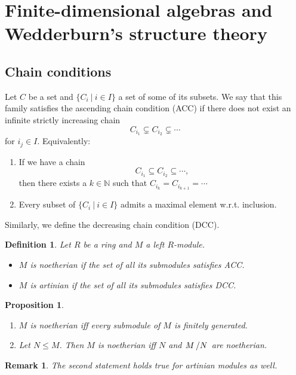 \documentclass[10pt, a4paper]{article}
\newtheorem{proposition}[thm]{Proposition}
\newtheorem{defi}[thm]{Definition}
\newenvironment{noticeB}{%
  \tcolorbox[%
  notitle,
  empty,
  enhanced,  %
  breakable,
  coltext=black,
  colback=white, 
  fontupper=\rmfamily,
  noparskip,
  sharp corners,
  boxrule=-1pt,  %
  frame hidden,
  left=7pt,  %
  right=7pt,
  top=5pt,
  bottom=5pt,
  before skip=2.5ex plus 2pt,
  after skip=2.5ex plus 2pt,
  borderline west = {1.5pt}{-0.1pt}{blue!30!black}, %
  overlay unbroken and last={%
    \draw[color=black, line width=1.25pt]
    ($(frame.south west)+(1.pt, -0.1pt)$) -- ++(2em, 0);
  }
  ]}
{\endtcolorbox}
\newenvironment{definition}{\begin{noticeB}\begin{defi}}{%
    \end{defi}\end{noticeB}}
\newtheorem*{remark}{Remark}
\newcommand{\N}{\mathbb {N}}
\newcommand{\quot}[2]{{\raisebox{0em}{$#1$}\left/\raisebox{0em}{$#2$}\right.}}
\begin{document}
\section{Finite-dimensional algebras and Wedderburn's structure theory}

\subsection{Chain conditions}

Let $C$ be a set and $\{C_i\ |\ i \in I\}$ a set of some of its subsets.
We say that this family satisfies the ascending chain condition (ACC)
if there does not exist an infinite strictly increasing chain 
$$C_{i_1} \subsetneq C_{i_2} \subsetneq \cdots$$
for $i_j \in I$.
Equivalently:
\begin{enumerate}
    \item If we have a chain 
    $$C_{i_1} \subseteq C_{i_2} \subseteq \cdots,$$
    then there exists a $k \in \N$ such that $C_{i_k} = C_{i_{k + 1}} = \cdots$
    \item Every subset of $\{C_i\ |\ i \in I\}$ admits a maximal element w.r.t. inclusion.
\end{enumerate}

Similarly, we define the decreasing chain condition (DCC).

\begin{definition}
    Let $R$ be a ring and $M$ a left $R$-module.
    \begin{itemize}
        \item $M$ is noetherian if the set of all its submodules satisfies ACC.
        \item $M$ is artinian if the set of all its submodules satisfies DCC.
    \end{itemize}
\end{definition}

\begin{proposition}
    \begin{enumerate}
        \item $M$ is noetherian iff every submodule of $M$ is finitely generated.
        \item Let $N \leq M$. Then $M$ is noetherian iff $N$ and $\quot{M}{N}$ are noetherian.
    \end{enumerate}
\end{proposition}

\begin{remark}
    The second statement holds true for artinian modules as well.
\end{remark}
\end{document}
